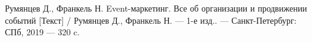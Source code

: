 \begin{thebibliography}{}
	 Румянцев Д., Франкель Н. Event-маркетинг. Все об организации и продвижении событий [Текст] / Румянцев Д., Франкель Н. — 1-е изд.. — Санкт-Петербург: СПб, 2019 — 320 c.
	
\end{thebibliography}
